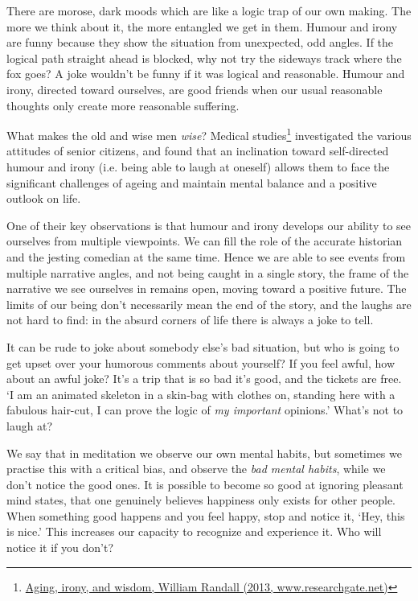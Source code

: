 
There are morose, dark moods which are like a logic trap of our own
making. The more we think about it, the more entangled we get in them.
Humour and irony are funny because they show the situation from
unexpected, odd angles. If the logical path straight ahead is blocked,
why not try the sideways track where the fox goes? A joke wouldn't be
funny if it was logical and reasonable. Humour and irony, directed
toward ourselves, are good friends when our usual reasonable thoughts
only create more reasonable suffering.

What makes the old and wise men \emph{wise}? Medical studies\footnote{\href{https://www.researchgate.net/publication/258190619_Aging_irony_and_wisdom_On_the_narrative_psychology_of_later_life}{Aging,
  irony, and wisdom, William Randall (2013, www.researchgate.net)}}
investigated the various attitudes of senior citizens, and found that an
inclination toward self-directed humour and irony (i.e. being able to
laugh at oneself) allows them to face the significant challenges of
ageing and maintain mental balance and a positive outlook on life.

One of their key observations is that humour and irony develops our
ability to see ourselves from multiple viewpoints. We can fill the role
of the accurate historian and the jesting comedian at the same time.
Hence we are able to see events from multiple narrative angles, and not
being caught in a single story, the frame of the narrative we see
ourselves in remains open, moving toward a positive future. The limits
of our being don't necessarily mean the end of the story, and the laughs
are not hard to find: in the absurd corners of life there is always a
joke to tell.

It can be rude to joke about somebody else's bad situation, but who is
going to get upset over your humorous comments about yourself? If you
feel awful, how about an awful joke? It's a trip that is so bad it's
good, and the tickets are free. `I am an animated skeleton in a skin-bag
with clothes on, standing here with a fabulous hair-cut, I can prove the
logic of \emph{my important} opinions.' What's not to laugh at?

We say that in meditation we observe our own mental habits, but
sometimes we practise this with a critical bias, and observe the
\emph{bad mental habits}, while we don't notice the good ones. It is
possible to become so good at ignoring pleasant mind states, that one
genuinely believes happiness only exists for other people. When
something good happens and you feel happy, stop and notice it, `Hey,
this is nice.' This increases our capacity to recognize and experience
it. Who will notice it if you don't?


